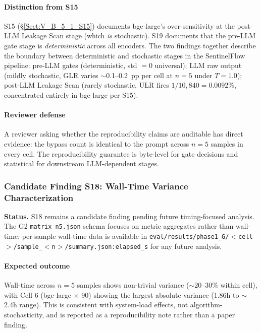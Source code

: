 \documentclass[journal]{IEEEtran}
\begin{document}
\paragraph{Distinction from S15}
S15 (\S\ref{Sect:V_B_5_1_S15}) documents bge-large's over-sensitivity at the post-LLM Leakage Scan stage (which \textit{is} stochastic). S19 documents that the pre-LLM gate stage is \textit{deterministic} across all encoders. The two findings together describe the boundary between deterministic and stochastic stages in the SentinelFlow pipeline: pre-LLM gates (deterministic, std $= 0$ universal); LLM raw output (mildly stochastic, GLR varies $\sim$0.1--0.2~pp per cell at $n{=}5$ under $T{=}1.0$); post-LLM Leakage Scan (rarely stochastic, ULR fires $1/10{,}840 = 0.0092\%$, concentrated entirely in bge-large per S15).

\paragraph{Reviewer defense}
A reviewer asking whether the reproducibility claims are auditable has direct evidence: the bypass count is identical to the prompt across $n{=}5$ samples in every cell. The reproducibility guarantee is byte-level for gate decisions and statistical for downstream LLM-dependent stages.

\subsubsection{Candidate Finding S18: Wall-Time Variance Characterization}
\label{Sect:V_B_5_5_S18}

\textbf{Status.} S18 remains a candidate finding pending future timing-focused analysis. The G2 \texttt{matrix\_n5.json} schema focuses on metric aggregates rather than wall-time; per-sample wall-time data is available in \texttt{eval/results/phase1\_G/$<$cell$>$/sample\_$<$n$>$/summary.json:elapsed\_s} for any future analysis.

\paragraph{Expected outcome}
Wall-time across $n{=}5$ samples shows non-trivial variance ($\sim$20--30\% within cell), with Cell 6 (bge-large $\times$ 90) showing the largest absolute variance (1.86h to $\sim$2.4h range). This is consistent with system-load effects, not algorithm-stochasticity, and is reported as a reproducibility note rather than a paper finding.
\end{document}
